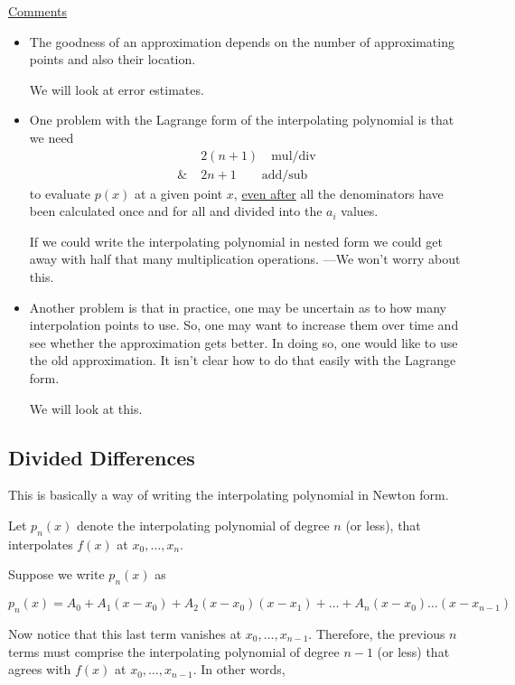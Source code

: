 \noindent \underline{Comments}
\begin{itemize}
 \renewcommand{\labelitemi}{$\qedsymbol$} 
 \item  The goodness of an approximation depends on the number of approximating points and also their location. 
 
        We will look at error estimates.
 \item One problem with the Lagrange form of the interpolating polynomial is that we need 
        \begin{align*}
                  &2(n+1) \quad \text{mul/div} \\
            \& \; &2n+1 \quad \quad \text{add/sub}
        \end{align*}
        to evaluate $p(x)$ at a given point $x$, \underline{even after} all the denominators have been calculated once and for all and divided into the $a_i$ values. 
        
        If we could write the interpolating polynomial in nested form we could get away with half that many multiplication operations. ---We won't worry about this. 
 \item Another problem is that in practice, one may be uncertain as to how many interpolation points to use. 
       So, one may want to increase them over time and see whether the approximation gets better. 
       In doing so, one would like to use the old approximation. 
       It isn't clear how to do that easily with the Lagrange form. 
       
       We will look at this. 
\end{itemize}

\subsection{Divided Differences}

This is basically a way of writing the interpolating polynomial in Newton form. 

Let $p_n(x)$ denote the interpolating polynomial of degree $n$ (or less), that interpolates $f(x)$ at $x_0, \dots, x_n$. 

Suppose we write $p_n(x)$ as

\begin{equation*}
    p_n(x) = A_0 + A_1(x-x_0) + A_2(x-x_0)(x-x_1)+ \dots + A_n(x-x_0)\dots(x-x_{n-1})
\end{equation*}

\vspace{-.4cm} 
\begin{figure}[H]
    \hspace{3.2cm}
    
    \label{fig:polynomial-2}
\end{figure}
\vspace{-.7cm} 
\noindent Now notice that this last term vanishes at $x_0, \dots, x_{n-1}$. Therefore, the previous $n$ terms must comprise the interpolating polynomial of degree $n-1$ (or less) that agrees with $f(x)$ at $x_0, \dots, x_{n-1}$. In other words,

